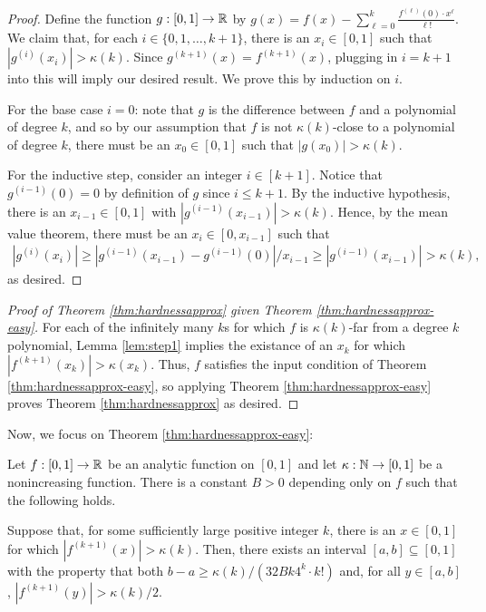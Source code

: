 \begin{proof}
Define the function $g : [0,1] \to {\mathbb R}$ by $g(x) = f(x) - \sum_{\ell=0}^k \frac{f^{(\ell)}(0) \cdot x^\ell}{\ell!}$. We claim that, for each $i \in \{0,1,\ldots,k+1\}$, there is an $x_i \in [0,1]$ such that $|g^{(i)}(x_i)| > \kappa(k)$. Since $g^{(k+1)}(x) = f^{(k+1)}(x)$, plugging in $i=k+1$ into this will imply our desired result. We prove this by induction on $i$.

For the base case $i=0$: note that $g$ is the difference between $f$ and a polynomial of degree $k$, and so by our assumption that $f$ is not $\kappa(k)$-close to a polynomial of degree $k$, there must be an $x_0 \in [0,1]$ such that $|g(x_0)| > \kappa(k)$.

For the inductive step, consider an integer $i\in [k+1]$. Notice that $g^{(i-1)}(0) = 0$ by definition of $g$ since $i \leq k+1$. By the inductive hypothesis, there is an $x_{i-1} \in [0,1]$ with $|g^{(i-1)}(x_{i-1})| > \kappa(k)$. Hence, by the mean value theorem, there must be an $x_i \in [0,x_{i-1}]$ such that 
\begin{align*}
    |g^{(i)}(x_i)| \geq |g^{(i-1)}(x_{i-1}) - g^{(i-1)}(0)|/x_{i-1} \geq |g^{(i-1)}(x_{i-1})| > \kappa(k),
\end{align*}
as desired.
\end{proof}

\begin{proof}[Proof of Theorem \ref{thm:hardnessapprox} given Theorem \ref{thm:hardnessapprox-easy}]
For each of the infinitely many $k$s for which $f$ is $\kappa(k)$-far from a degree $k$ polynomial, Lemma \ref{lem:step1} implies the existance of an $x_k$ for which $|f^{(k+1)}(x_k)| > \kappa(x_k)$. Thus, $f$ satisfies the input condition of Theorem \ref{thm:hardnessapprox-easy}, so applying Theorem \ref{thm:hardnessapprox-easy} proves Theorem \ref{thm:hardnessapprox} as desired.
\end{proof}

Now, we focus on Theorem \ref{thm:hardnessapprox-easy}:

\begin{lemma} \label{lem:step2}
Let $f : [0,1] \to {\mathbb R}$ be an analytic function on $[0,1]$ and let $\kappa: {\mathbb N} \to [0,1]$ be a nonincreasing function. There is a constant $B>0$ depending only on $f$ such that the following holds.

Suppose that, for some sufficiently large positive integer $k$, there is an $x\in [0,1]$ for which $|f^{(k+1)}(x)| > \kappa(k)$.
Then, there exists an interval $[a,b]\subseteq [0,1]$ with the property that both $b - a \geq \kappa(k) / (32 Bk4^k \cdot k!)$ and, for all $y\in [a,b]$, $|f^{(k+1)}(y)| > \kappa(k)/2$.
\end{lemma}

